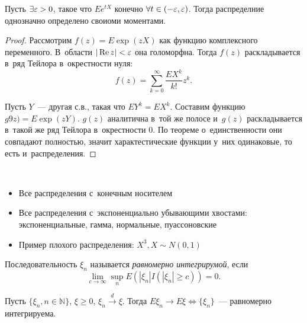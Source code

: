 \documentclass{article}
\begin{document}
\begin{lemma}
	Пусть $\exists \varepsilon > 0$, такое что $Ee^{tX}$ конечно $\forall t \in (-\varepsilon,
	\varepsilon)$. Тогда распределние однозначно определено своиоми моментами.
\end{lemma}
\begin{proof}
	Рассмотрим $f(z) = E\exp(zX)$ как функцию комплексного переменного. В~области
	$|\operatorname{Re} z| < \varepsilon$ она голоморфна. Тогда $f(z)$ раскладывается в~ряд Тейлора
	в~окрестности нуля:
	$$f(z) = \sum\limits_{k=0}^\infty \frac{EX^k}{k!} z^k.$$

	Пусть $Y$~--- другая с.в., такая что $EY^k = EX^k$. Составим функцию $g9z) =
	E\exp(zY)$. $g(z)$ аналитична в~той же полосе и~$g(z)$ раскладывается в~такой
	же ряд Тейлора в~окрестности 0. По теореме о~единственности они совпадают
	полностью, значит характестические функции у~них одинаковые, то есть
	и~распределения.
\end{proof}

\begin{example}~\
	\begin{itemize}
		\item Все распределения с~конечным носителем
		\item Все распределения с~экспоненциально убывающими хвостами:
			экспоненциальные, гамма, нормальные, пуассоновские
		\item Пример плохого распределения: $X^3, X \sim N(0, 1)$
	\end{itemize}
\end{example}

\begin{definition}
	Последовательность $\xi_n$ называется \emph{равномерно интегрирумой}, если
	$$ \lim\limits_{c \rightarrow \infty} \sup\limits_n E(|\xi_n|I(|\xi_n| \ge c))
	= 0.$$
\end{definition}

\begin{theorem}
	Пусть $\{\xi_n, n \in \mathbb{N}\}$, $\xi \ge 0$, $\xi_n
	\overset{d}\rightarrow \xi$. Тогда $E\xi_n \rightarrow E\xi \Leftrightarrow
	\{\xi_n\}$~--- равномерно интегрируема.
\end{theorem}
\end{document}
